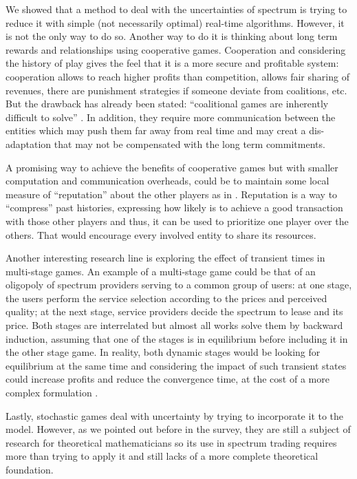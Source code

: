 We showed that a method to deal with the uncertainties of spectrum is trying to reduce it with simple (not necessarily optimal) real-time algorithms. 
However, it is not the only way to do so. 
Another way to do it is thinking about long term rewards and relationships using cooperative games. 
Cooperation and considering the history of play gives the feel that it is a more secure and profitable system: cooperation allows to reach higher profits than competition, allows fair sharing of revenues, there are punishment strategies if someone deviate from coalitions, etc. 
But the drawback has already been stated: ``coalitional games are inherently difficult to solve'' \cite{ref:Li2011}.  In addition, they require more communication between the entities which may push them far away from real time and may creat a dis-adaptation that may not be compensated with the long term commitments. 

A promising way to achieve the benefits of cooperative games but with smaller computation and communication overheads, could be to maintain some local measure of ``reputation'' about the other players as in \cite{ref:Yan2011}.
Reputation is a way to ``compress'' past histories, expressing how likely is to achieve a good transaction with those other players and thus, it can be used to prioritize one player over the others. 
That would encourage every involved entity to share its resources. 

Another interesting research line is exploring the effect of transient times in multi-stage games. 
An example of a multi-stage game could be that of an oligopoly of spectrum providers serving to a common group of users: at one stage, the users perform the service selection according to the prices and perceived quality; at the next stage, service providers decide the spectrum to lease and its price. 
Both stages are interrelated but almost all works solve them by backward induction, assuming that one of the stages is in equilibrium before including it in the other stage game. 
In reality, both dynamic stages would be looking for equilibrium at the same time and considering the impact of such transient states could increase profits and reduce the convergence time, at the cost of a more complex formulation \cite{ref:Zhu2012_Dyn}.

Lastly, stochastic games deal with uncertainty by trying to incorporate it to the model. 
However, as we pointed out before in the survey, they are still a subject of research for theoretical mathematicians so its use in spectrum trading requires more than trying to apply it and still lacks of a more complete theoretical foundation. 

